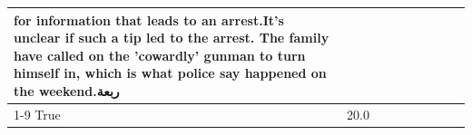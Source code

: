 \begin{table}[H]
\begin{tabular}{lllrlllll}
for information that leads to an arrest.It's unclear if such a tip led to the arrest. The family have called on the 'cowardly' gunman to turn himself in, which is what police say happened on the weekend.ربعة \\
\cline{1-9}
True & 20.0%
\end{tabular}
\end{table}

